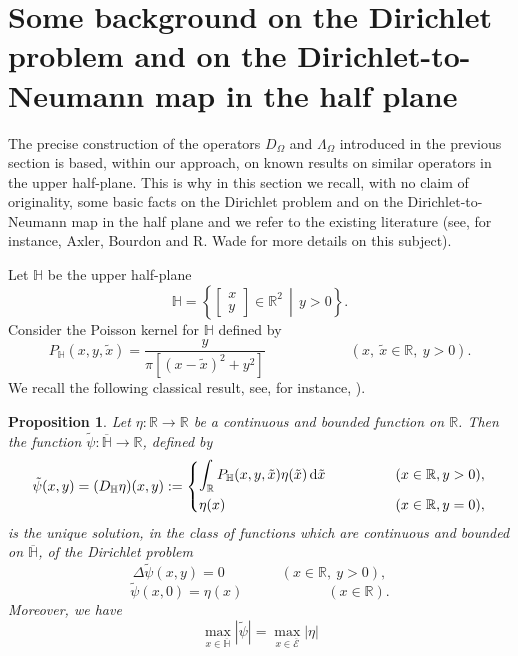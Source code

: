 \documentclass{amsart} %
\numberwithin{equation}{section}
\newtheorem{proposition}[theorem]{Proposition}
\theoremstyle{definition}
\begin{document}
\section{Some background on the Dirichlet problem and on the Dirichlet-to-Neumann map in the half plane}\label{sec_half}
The precise construction of the operators $D_\Omega$ and $\Lambda_\Omega$ introduced in the previous section is based, within our approach, on known results on similar operators in the upper half-plane. This is why in this section we recall, with no claim of originality, some basic facts on the Dirichlet problem and on the Dirichlet-to-Neumann map in the half plane and we refer to the existing literature (see, for instance, Axler, Bourdon and R. Wade \cite{axler2013harmonic} for more details on this subject).

Let $\mathbb{H}$ be the upper half-plane
\begin{equation}\label{def_upper}
\mathbb{H}=\left\{\left.\begin{bmatrix} x\\ y\end{bmatrix}\in \mathbb{R}^2\ \ \right|\ \ y>0\right\}.
\end{equation}
Consider the Poisson kernel for $\mathbb{H}$ defined by
\begin{equation}\label{def_poisson}
P_\mathbb{H} (x,y,\tilde x)=\frac{y}{\pi\left[(x-\tilde x)^2+y^2\right]} \qquad\qquad\qquad(x,\ \tilde x\in \mathbb{R},\ y>0).
\end{equation}
We recall the following classical  result, see, for instance, \cite[Theorems 7.3,7.4,7.5]{axler2013harmonic}).


\begin{proposition}\label{axler_classical}
Let $\eta:\mathbb{R}\to \mathbb{R}$ be a continuous and bounded function on $\mathbb{R}$. Then the function  $\tilde\psi: \overline{\mathbb{H}}\to \mathbb{R}$, defined by
\begin{equation}\label{Poisson_extins_bis}
\tilde \psi(x,y)=(D_\mathbb{H} \eta)(x,y):=\begin{dcases}
\int_\mathbb{R} P_\mathbb{H} (x,y,\tilde x) \eta(\tilde x)\, {\rm d}\tilde x & \qquad\qquad(x\in \mathbb{R},y>0),\\
\eta(x) & \qquad\qquad(x\in \mathbb{R},y=0),
\end{dcases}
\end{equation}
is the unique  solution, in the class of functions which are continuous and bounded on $\overline{\mathbb{H}}$, of the Dirichlet problem
\begin{equation}\label{Diri_tot}
\Delta \tilde \psi(x,y)=0 \qquad\qquad(x\in \mathbb{R},\ y>0),
\end{equation}
\begin{equation}\label{frontiera_tot}
\tilde\psi(x,0)=\eta(x) \qquad\qquad\qquad(x\in \mathbb{R}).
\end{equation}
Moreover, we have
\begin{equation}\label{max_princ}
\max_{x\in\overline{\mathbb{H}}} |\tilde\psi|=\max_{x\in\overline{\mathcal{E}}} |\eta|
\end{equation}
\end{proposition}
\end{document}
